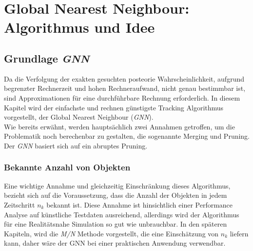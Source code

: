 \documentclass[10pt,a4paper]{article}
\begin{document}
\section{Global Nearest Neighbour: Algorithmus und Idee}
\subsection{Grundlage \textit{GNN}}
Da die Verfolgung der exakten gesuchten posteorie Wahrscheinlichkeit, aufgrund begrenzter Rechnerzeit und hohen Rechneraufwand, nicht genau bestimmbar ist, sind Approximationen für eine durchführbare Rechnung erforderlich. In diesem Kapitel wird der einfachste und rechnen günstigste Tracking Algorithmus vorgestellt, der Global Nearest Neighbour (\textit{GNN}).\\
Wie bereits erwähnt, werden hauptsächlich zwei Annahmen getroffen, um die Problematik noch berechenbar zu gestalten, die sogenannte Merging und Pruning. Der \textit{GNN} basiert sich auf ein abruptes Pruning.
\subsubsection{Bekannte Anzahl von Objekten}
Eine wichtige Annahme und gleichzeitig Einschränkung dieses Algorithmus, bezieht sich auf die Voraussetzung, dass die Anzahl der Objekten in jedem Zeitschritt $n_k$ bekannt ist. Diese Annahme ist hinsichtlich einer Performance Analyse auf künstliche Testdaten ausreichend, allerdings wird der Algorithmus für eine Realitätsnahe Simulation so gut wie unbrauchbar. In den späteren Kapiteln, wird die \textit{M/N} Methode vorgestellt, die eine Einschätzung von $n_k$ liefern kann, daher wäre der GNN bei einer praktischen Anwendung verwendbar.
\end{document}
